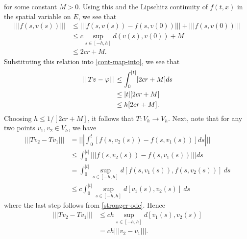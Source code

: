 %
%
for some constant $M > 0$. Using this and the Lipschitz continuity of $f(t, x)$
in the spatial variable on $E$, we see that
%
%
\begin{equation*}
\begin{split}
| | | f(s, v(s) ) | | | 
& \le | | | f(s, v(s)) - f(s, v(0)) ||| + ||| f(s, v(0)) |||
\\
& \le c \sup_{s \in [-h, h]}  d(v(s), v(0)) +  M
\\
& \le 2cr + M.
\end{split}
\end{equation*}
%
%
Substituting this relation into \eqref{cont-map-into}, we see that
\begin{equation*}
  \begin{split}
| | | Tv - \varphi| | |
& \le 
\int_0^{|t|} [2cr + M ] ds
    \\
    & \le  |t| [ 2cr + M]
		\\
    & \le  h [ 2cr + M].
\end{split}
\end{equation*}
%
%
%
Choosing $h \le 1/[2cr + M]$, it follows that $T: V_h \to V_h$. 
%
%
Next, note that for any two points $v_1, v_2 \in
V_h$, we have
%
%
\begin{equation}
	\label{cont-part-1}
	\begin{split}
		| | | Tv_2 - Tv_1 | | | 
		& = | | | \int_0^t \left[ f(s, v_2(s) ) - f(s, v_1 (s) ) \right]ds | | |
		\\
    & \le \int_0^{|t|} | | | f(s, v_2(s) ) - f(s, v_1 (s) ) | | | ds
		\\
    & = \int_0^{|t|} \sup_{s \in [-h, h]} d[f(s, v_1(s) ), f(s, v_2 (s) )] \ ds
		\\
    & \le c \int_0^{|t|}  \sup_{s \in [-h, h]} d[v_1(s), v_2 (s)] \
		ds
		\end{split}
\end{equation}
%
%
where the last step follows from \eqref{stronger-ode}. Hence
\begin{equation*}
	\begin{split}
		| | | Tv_2 - Tv_1 | | | 
		& \le c h \sup_{s \in [-h, h]} d[v_1(s), v_2 (s)]
		\\
		& = ch |||v_2 - v_1|||.
	\end{split}
\end{equation*}

